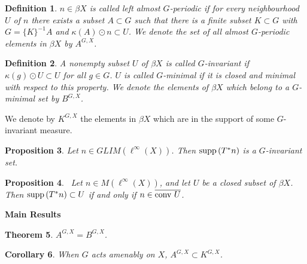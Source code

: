 \documentclass[landscape]{slides}
\newtheorem{defn}{Definition}
\newtheorem{theorem}[defn]{Theorem}
\newtheorem{proposition}[defn]{Proposition}
\newtheorem{corollary}[defn]{Corollary}
\begin{document}
\begin{slide}
\begin{defn}
$n \in \beta X$ is called {\it left almost $G$-periodic} if for every neighbourhood $U$ of $n$
there exists a subset $A \subset G$ such that there is a finite subset $K \subset G$ with
$G = \{K\}^{-1}A$ and $\kappa(A) \odot n \subset U$.  We denote the set of all almost
$G$-periodic elements in $\beta X$ by $A^{G,X}$.\\
\end{defn}

\begin{defn}
A nonempty subset $U$ of $\beta X$ is called $G$-{\it invariant} if $\kappa(g) \odot U \subset U$ for all
$g\in G$.  $U$ is called $G$-{\it minimal} if it is closed and minimal with respect to this property.
We denote the elements of $\beta X$ which belong to a $G$-minimal set by $B^{G,X}$.
\end{defn}

We denote by $K^{G,X}$ the elements in $\beta X$ which are in the support of some $G$-invariant
measure.\\

\end{slide}

\begin{slide}
\begin{proposition}\label{fairchild2.1}
Let $n\in GLIM(\ell^\infty(X))$.  Then $\operatorname{supp\,} (T^*n)$ is a $G$-invariant set.\\
\end{proposition}

\begin{proposition}~\label{w&w}
Let $n\in M(\ell^\infty(X))$, and let $U$ be a closed subset of $\beta X$.
Then $\operatorname{supp\,}(T^*n) \subset U$ if and only if $n\in\overline{\operatorname{conv\,} U}$.
\end{proposition}
{\bf Main Results}\\
\begin{theorem}\label{fairchild3.1}
$A^{G,X} = B^{G,X}$.\\
\end{theorem}

\begin{corollary}
When $G$ acts amenably on $X$, $A^{G,X} \subset K^{G,X}$.
\end{corollary}
\end{slide}
\end{document}
